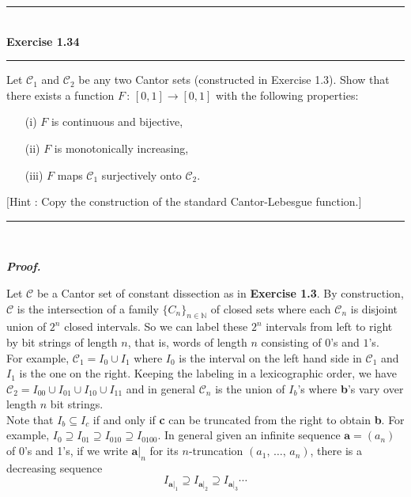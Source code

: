 \documentclass[a4paper,11pt]{article}
\begin{document}

\begin{flushleft}
	\rule[-0.5ex]{17cm}{2pt}\\
		\textbf{Exercise 1.34}\\
	\rule[1.5ex]{17cm}{0.5pt}
		Let $\mathcal{C}_1$ and $\mathcal{C}_2$ be any two Cantor sets (constructed in Exercise 1.3). Show that there exists a function $F\,:\,[0, 1] \to [0, 1]$ with the following properties:
		\begin{enumerate}
			\item [(i)] $F$ is continuous and bijective,

			\item [(ii)] $F$ is monotonically increasing,

			\item [(iii)] $F$ maps $\mathcal{C}_1$ surjectively onto $\mathcal{C}_2$.
		\end{enumerate}
		$[$Hint : Copy the construction of the standard Cantor-Lebesgue function.$]$
	\rule[1.0ex]{17cm}{0.5pt}\
\end{flushleft}

\textbf{\textit{Proof.}}

Let $\mathcal{C}$ be a Cantor set of constant dissection as in \textbf{Exercise 1.3}. By construction, $\mathcal{C}$ is the intersection of a family $\{C_n\}_{n \in \mathbb{N}}$ of closed sets where each $\mathcal{C}_n$ is disjoint union of $2^n$ closed intervals. So we can label these $2^n$ intervals from left to right by bit strings of length $n$, that is, words of length $n$ consisting of $0$'s and $1$'s.\\

For example, $\mathcal{C}_1 = I_0 \cup I_1$ where $I_0$ is the interval on the left hand side in $\mathcal{C}_1$ and $I_1$ is the one on the right. Keeping the labeling in a lexicographic order, we have $\mathcal{C}_2 = I_{00} \cup I_{01} \cup I_{10} \cup I_{11}$ and in general $\mathcal{C}_n$ is the union of $I_b$'s where \textbf{b}'s vary over length $n$ bit strings.\\

Note that $I_b \subseteq I_c$ if and only if \textbf{c} can be truncated from the right to obtain \textbf{b}. For example, $I_0 \supseteq I_{01} \supseteq I_{010} \supseteq I_{0100}$. In general given an infinite sequence $\textbf{a} = (a_n)$ of 0's and 1's, if we write $\textbf{a}|_n$ for its $n$-truncation $(a_1,\,\dots,\,a_n)$, there is a decreasing sequence
	$$I_{\textbf{a}|_1} \supseteq I_{\textbf{a}|_2} \supseteq I_{\textbf{a}|_3} \cdots$$
\end{document}

